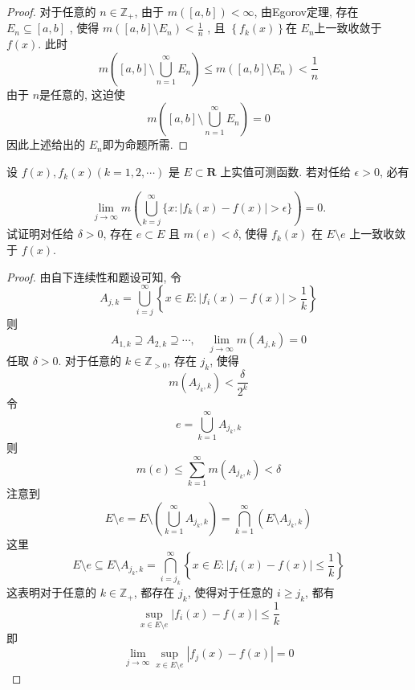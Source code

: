 \documentclass[../main.tex]{subfiles}
\begin{document}
\begin{proof}
    对于任意的 \(  n \in \mathbb{Z} _{+ }  \), 由于 \(  m\left( [a,b] \right)< \infty   \), 由Egorov定理,  存在 \(  E_{n}\subseteq \left[ a,b \right]   \) , 使得 \(  m\left( \left[ a,b \right]\setminus E_{n}  \right)  < \frac{1 }{n }  \) , 且 \(  \left\{ f_{k}\left( x \right)  \right\}  \)在 \(  E_{n}  \)上一致收敛于 \(  f\left( x \right)   \). 此时 \[
    m\left( \left[ a,b \right]\setminus \bigcup _{n = 1}^{\infty}E_{n}  \right)\le m\left( \left[ a,b \right]\setminus E_{n}  \right)< \frac{1 }{n }   
    \]由于 \(  n  \)是任意的, 这迫使\[
    m\left( \left[ a,b \right]\setminus \bigcup _{n = 1}^{\infty}E_{n}  \right)= 0 
    \]    因此上述给出的 \(  E_{n}  \)即为命题所需. 
\end{proof}
\begin{exercise}{}{}
    设 $f(x), f_k(x) (k=1,2,\cdots)$ 是 $E \subset \mathbf{R}$ 上实值可测函数. 若对任给 $\epsilon>0$, 必有

$$\lim_{j \to \infty} m\left(\bigcup_{k=j}^{\infty} \{x: |f_k(x) - f(x)| > \epsilon\}\right) = 0.$$
试证明对任给 $\delta>0$, 存在 $e \subset E$ 且 $m(e) < \delta$, 使得 $f_k(x)$ 在 $E \setminus e$ 上一致收敛于 $f(x)$.
\end{exercise}
\begin{proof}
    由自下连续性和题设可知,  令 \[
    A_{j,k}= \bigcup _{i= j}^{\infty}\left\{ x\in E:\left| f_{i}\left( x \right)-f\left( x \right)   \right|>  \frac{1 }{k }  \right\}
    \]则 \[
    A_{1,k}\supseteq A_{2,k}\supseteq \cdots ,\quad \lim_{j\to \infty}m\left( A_{j,k} \right)= 0 
    \]任取 \(   \delta > 0  \). 对于任意的 \(  k \in \mathbb{Z} _{> 0}  \), 存在 \(  j_{k}  \), 使得    \[
    m\left( A_{j_{k},k} \right)< \frac{  \delta  }{2^{k} }  
    \] 令 \[
    e= \bigcup _{k = 1}^{\infty}A_{j_{k},k}
    \]则 \[
    m\left( e \right)\le \sum _{k= 1}^{\infty}m\left( A_{j_{k},k} \right)  <   \delta 
    \]注意到 \[
    E\setminus e=  E\setminus \left( \bigcup _{k = 1}^{\infty}A_{j_{k},k} \right)= \bigcap _{k = 1}^{\infty}\left( E\setminus A_{j_{k},k} \right)  
    \]这里 \[
    E\setminus e\subseteq E\setminus A_{j_{k},k}= \bigcap _{i = j_{k}}^{\infty}\left\{ x\in E: \left| f_{i}\left( x \right)-f\left( x \right)   \right|\le \frac{1 }{k }   \right\}
    \]这表明对于任意的 \(  k \in \mathbb{Z} _{+ }  \), 都存在 \(  j_{k}  \), 使得对于任意的 \(  i\ge j_{k}  \), 都有   \[
    \sup _{ x \in E\setminus e}\left| f_{i}\left( x \right)-f\left( x \right)   \right|\le \frac{1 }{k }  
    \] 即\[
    \lim_{j\to \infty}\sup _{x \in E\setminus e}\left| f_{j}\left( x \right)-f\left( x \right)   \right|= 0 
    \]
\end{proof}
\end{document}
